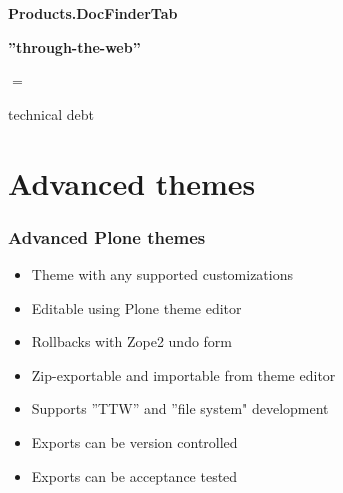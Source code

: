 \documentclass[aspectratio=43]{beamer}
\begin{document}
\begin{frame}[plain,c]
  \huge
  \bfseries
  \centering
  \vspace{1cm}
  Products.DocFinderTab
\end{frame}

\begin{frame}[plain,t]
  \vspace{8em}
  \huge
  \bfseries
  \centering
  ”through-the-web”
  \par
  $=$
  \par
  technical debt
\end{frame}

\section{Advanced themes}

\begin{frame}[plain,t]
  \frametitle{Advanced Plone themes}
  \vspace{1em}
  \begin{itemize}[<+->]
  \setlength{\itemsep}{1em}
  \item Theme with any supported customizations
  \item Editable using Plone theme editor
  \item Rollbacks with Zope2 undo form
  \item Zip-exportable and importable from theme editor
  \item Supports ”TTW” and ”file system" development
  \item Exports can be version controlled
  \item Exports can be acceptance tested
  \end{itemize}
\end{frame}
\end{document}
